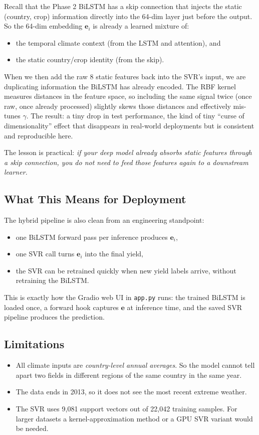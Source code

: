 \documentclass[conference]{IEEEtran}
\begin{document}
Recall that the Phase 2 BiLSTM has a skip connection that injects the static (country, crop) information directly into the 64-dim layer just before the output. So the 64-dim embedding $\mathbf{e}_i$ is already a learned mixture of:
\begin{itemize}
    \item the temporal climate context (from the LSTM and attention), and
    \item the static country/crop identity (from the skip).
\end{itemize}
When we then add the raw 8 static features back into the SVR's input, we are duplicating information the BiLSTM has already encoded. The RBF kernel measures distances in the feature space, so including the same signal twice (once raw, once already processed) slightly skews those distances and effectively mis-tunes $\gamma$. The result: a tiny drop in test performance, the kind of tiny ``curse of dimensionality'' effect that disappears in real-world deployments but is consistent and reproducible here.

The lesson is practical: \emph{if your deep model already absorbs static features through a skip connection, you do not need to feed those features again to a downstream learner.}

\subsection{What This Means for Deployment}
The hybrid pipeline is also clean from an engineering standpoint:
\begin{itemize}
    \item one BiLSTM forward pass per inference produces $\mathbf{e}_i$,
    \item one SVR call turns $\mathbf{e}_i$ into the final yield,
    \item the SVR can be retrained quickly when new yield labels arrive, without retraining the BiLSTM.
\end{itemize}
This is exactly how the Gradio web UI in \texttt{app.py} runs: the trained BiLSTM is loaded once, a forward hook captures $\mathbf{e}$ at inference time, and the saved SVR pipeline produces the prediction.

\subsection{Limitations}
\begin{itemize}
    \item All climate inputs are \emph{country-level annual averages}. So the model cannot tell apart two fields in different regions of the same country in the same year.
    \item The data ends in 2013, so it does not see the most recent extreme weather.
    \item The SVR uses 9{,}081 support vectors out of 22{,}042 training samples. For larger datasets a kernel-approximation method or a GPU SVR variant would be needed.
\end{itemize}
\end{document}
